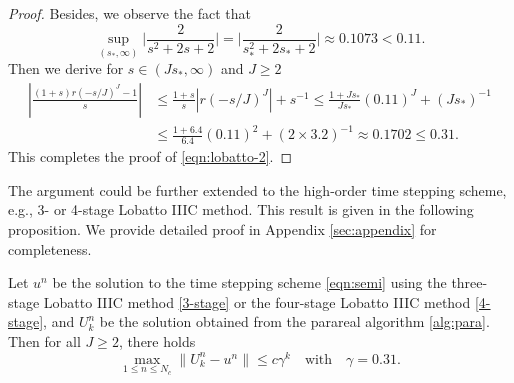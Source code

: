 \begin{proof}
Besides, we observe the fact that
$$\sup\limits_{(s_*, \infty)}
\Big|\frac{2}{s^2 + 2s + 2}\Big|
= \Big|\frac{2}{s_*^2 + 2s_* + 2}\Big|
\approx 0.1073 < 0.11.$$
Then we derive for $s\in (Js_*,\infty)$ and $J\ge 2$
\begin{equation*}
\begin{split}
    \left|\frac{(1+s) r(-s/J)^J-1}{s}\right|
    &\le \frac{1+s}{s}|r(-s/J)^J|+s^{-1}
    \le \frac{1+Js_*}{Js_*} (0.11)^J + (Js_*)^{-1}    \\
    &\le  \frac{1+6.4}{6.4} (0.11)^2 + (2\times 3.2)^{-1}
    \approx 0.1702 \le 0.31.
\end{split}
\end{equation*}
This completes the proof of \eqref{eqn:lobatto-2}.
\end{proof}

The argument could be further extended to the high-order time stepping scheme, e.g., 3- or 4-stage Lobatto IIIC method.
This result is given in the following proposition. We provide detailed proof in Appendix \ref{sec:appendix} for completeness.

\begin{proposition}\label{prop:lobatto-34}
Let $u^n$ be the solution to the time stepping scheme
\eqref{eqn:semi} using
the three-stage Lobatto IIIC method \eqref{3-stage} or the four-stage Lobatto IIIC method \eqref{4-stage},
and $U_k^n$ be the solution obtained from the parareal algorithm \ref{alg:para}. Then for all $J \ge 2$, there holds
$$ \max_{1 \le n\le N_c} \| U_k^n - u^n \|  \le c \gamma^k\quad \text{with} \quad \gamma=0.31.$$
\end{proposition}

